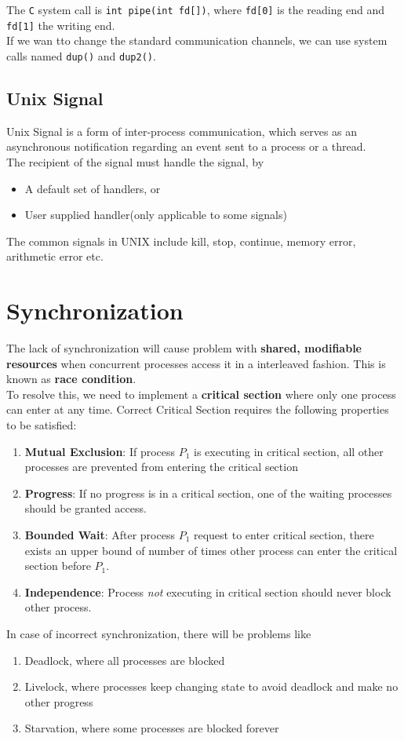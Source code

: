 \documentclass[11pt]{article}
\theoremstyle{definition}
\begin{document}
The \texttt{C} system call is \texttt{int pipe(int fd[])}, where \texttt{fd[0]} is the reading end and \texttt{fd[1]} the writing end.\\

If we wan tto change the standard communication channels, we can use system calls named \texttt{dup()} and \texttt{dup2()}.
\subsection{Unix Signal}
Unix Signal is a form of inter-process communication, which serves as an asynchronous notification regarding an event sent to a process or a thread.\\
The recipient of the signal must handle the signal, by
\begin{itemize}[itemsep=0pt]
  \item A default set of handlers, or
  \item User supplied handler(only applicable to some signals)
\end{itemize}
The common signals in UNIX include kill, stop, continue, memory error, arithmetic error etc.
\section{Synchronization}
The lack of synchronization will cause problem with \textbf{shared, modifiable resources} when concurrent processes access it in a interleaved fashion. This is known as \textbf{race condition}.\\
To resolve this, we need to implement a \textbf{critical section} where only one process can enter at any time. Correct Critical Section requires the following properties to be satisfied:
\begin{enumerate}
  \item \textbf{Mutual Exclusion}: If process $P_1$ is executing in critical section, all other processes are prevented from entering the critical section
  \item \textbf{Progress}: If no progress is in a critical section, one of the waiting processes should be granted access.
  \item \textbf{Bounded Wait}: After process $P_1$ request to enter critical section, there exists an upper bound of number of times other process can enter the critical section before $P_1$.
  \item \textbf{Independence}: Process \textit{not} executing in critical section should never block other process. 
\end{enumerate}
In case of incorrect synchronization, there will be problems like
\begin{enumerate}
  \item Deadlock, where all processes are blocked
  \item Livelock, where processes keep changing state to avoid deadlock and make no other progress
  \item Starvation, where some processes are blocked forever
\end{enumerate}
\end{document}
